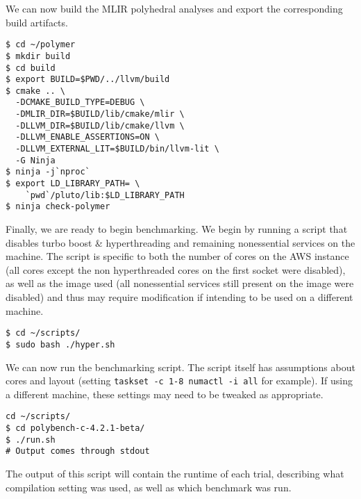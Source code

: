 \noindent We can now build the MLIR polyhedral analyses and export the corresponding build artifacts.

\begin{small}
\begin{verbatim}
$ cd ~/polymer
$ mkdir build
$ cd build
$ export BUILD=$PWD/../llvm/build
$ cmake .. \
  -DCMAKE_BUILD_TYPE=DEBUG \
  -DMLIR_DIR=$BUILD/lib/cmake/mlir \
  -DLLVM_DIR=$BUILD/lib/cmake/llvm \
  -DLLVM_ENABLE_ASSERTIONS=ON \
  -DLLVM_EXTERNAL_LIT=$BUILD/bin/llvm-lit \
  -G Ninja
$ ninja -j`nproc`
$ export LD_LIBRARY_PATH= \
    `pwd`/pluto/lib:$LD_LIBRARY_PATH
$ ninja check-polymer
\end{verbatim}
\end{small}

\noindent Finally, we are ready to begin benchmarking. We begin by running a script that disables turbo boost \& hyperthreading and remaining nonessential services on the machine. The script is specific to both the number of cores on the AWS instance (all cores except the non hyperthreaded cores on the first socket were disabled), as well as the image used (all nonessential services still present on the image were disabled) and thus may require modification if intending to be used on a different machine.

\begin{small}
\begin{verbatim}
$ cd ~/scripts/
$ sudo bash ./hyper.sh    
\end{verbatim}
\end{small}

\noindent We can now run the benchmarking script. The script itself has assumptions about cores and layout (setting \verb`taskset -c 1-8 numactl -i all` for example). If using a different machine, these settings may need to be tweaked as appropriate.

\begin{small}
\begin{verbatim}
cd ~/scripts/
$ cd polybench-c-4.2.1-beta/
$ ./run.sh
# Output comes through stdout
\end{verbatim}
\end{small}

\noindent The output of this script will contain the runtime of each trial, describing what compilation setting was used, as well as which benchmark was run.